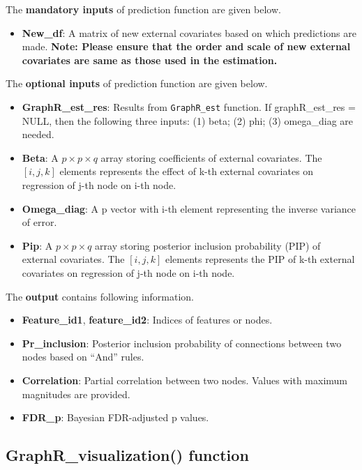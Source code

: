 \documentclass[
]{book}
\providecommand{\tightlist}{%
  \setlength{\itemsep}{0pt}\setlength{\parskip}{0pt}}
\begin{document}
The \textbf{mandatory inputs} of prediction function are given below.

\begin{itemize}
\tightlist
\item
  \textbf{New\_df}: A matrix of new external covariates based on which predictions are made. \textbf{Note: Please ensure that the order and scale of new external covariates are same as those used in the estimation.}
\end{itemize}

The \textbf{optional inputs} of prediction function are given below.

\begin{itemize}
\item
  \textbf{GraphR\_est\_res}: Results from \texttt{GraphR\_est} function. If graphR\_est\_res = NULL, then the following three inputs: (1) beta; (2) phi; (3) omega\_diag are needed.
\item
  \textbf{Beta}: A \(p \times p \times q\) array storing coefficients of external covariates. The \([i,j,k]\) elements represents the effect of k-th external covariates on regression of j-th node on i-th node.
\item
  \textbf{Omega\_diag}: A p vector with i-th element representing the inverse variance of error.
\item
  \textbf{Pip}: A \(p \times p \times q\) array storing posterior inclusion probability (PIP) of external covariates. The \([i,j,k]\) elements represents the PIP of k-th external covariates on regression of j-th node on i-th node.
\end{itemize}

The \textbf{output} contains following information.

\begin{itemize}
\item
  \textbf{Feature\_id1}, \textbf{feature\_id2}: Indices of features or nodes.
\item
  \textbf{Pr\_inclusion}: Posterior inclusion probability of connections between two nodes based on ``And'' rules.
\item
  \textbf{Correlation}: Partial correlation between two nodes. Values with maximum magnitudes are provided.
\item
  \textbf{FDR\_p}: Bayesian FDR-adjusted p values.
\end{itemize}

\hypertarget{graphr_visualization-function}{%
\subsection{GraphR\_visualization() function}\label{graphr_visualization-function}}
\end{document}
